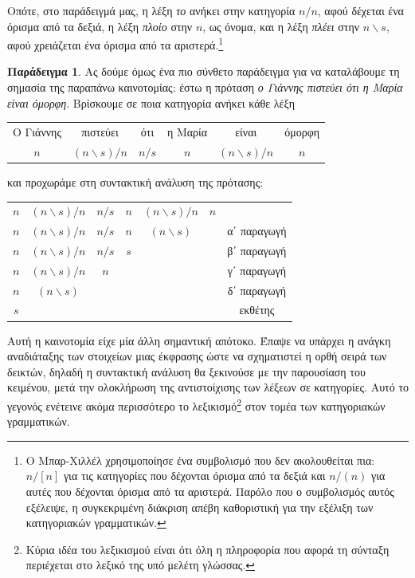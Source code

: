 \documentclass [a4paper,11pt] {book}
\theoremstyle{definition}
\newtheorem{example}[theorem]{Παράδειγμα}
\theoremstyle{definition}
\begin{document}
Οπότε, στο παράδειγμά μας, η λέξη \textit{το} ανήκει στην κατηγορία $n/n$, αφού δέχεται ένα όρισμα από τα δεξιά, η λέξη \textit{πλοίο} στην $n$, ως όνομα, και η λέξη \textit{πλέει} στην $n \backslash s$, αφού χρειάζεται ένα όρισμα από τα αριστερά.\footnote{Ο Μπαρ-Χιλλέλ χρησιμοποίησε ένα συμβολισμό που δεν ακολουθείται πια: $n/[n]$ για τις κατηγορίες που δέχονται όρισμα από τα δεξιά και $n/(n)$ για αυτές που δέχονται όρισμα από τα αριστερά. Παρόλο που ο συμβολισμός αυτός εξέλειψε, η συγκεκριμένη διάκριση απέβη καθοριστική για την εξέλιξη των κατηγοριακών γραμματικών.}
\begin{example}
\label{complexExampleABGr}
Ας δούμε όμως ένα πιο σύνθετο παράδειγμα για να καταλάβουμε τη σημασία της παραπάνω καινοτομίας: έστω η πρόταση \textit{ο Γιάννης πιστεύει ότι η Μαρία είναι όμορφη}. Βρίσκουμε σε ποια κατηγορία ανήκει κάθε λέξη
\begin{center}
\begin{tabular}{cccccc}
Ο Γιάννης & πιστεύει & ότι & η Μαρία & είναι & όμορφη\\ 
$n$ & $(n\backslash s)/n$ & $n/s$ & $n$ & $(n\backslash s)/n$ & $n$ \\ 
\end{tabular} 
\end{center}
και προχωράμε στη συντακτική ανάλυση της πρότασης:
\begin{center}
\begin{tabular}{ccccccc}
$n$ & $(n\backslash s)/n$ & $n/s$ & $n$ & $(n\backslash s)/n$ & $n$ \\
$n$ & $(n\backslash s)/n$ & $n/s$ & $n$ & $(n\backslash s)$ && α΄ παραγωγή\\
$n$ & $(n\backslash s)/n$ & $n/s$ & $s$ &&& β΄ παραγωγή\\
$n$ & $(n\backslash s)/n$ & $n$ &&&& γ΄ παραγωγή\\
$n$ & $(n\backslash s)$ &&&&& δ΄ παραγωγή\\
$s$ &&&&&& εκθέτης
\end{tabular}
\end{center}
\end{example}
Αυτή η καινοτομία είχε μία άλλη σημαντική απότοκο. Έπαψε να υπάρχει η ανάγκη αναδιάταξης των στοιχείων μιας έκφρασης ώστε να σχηματιστεί η ορθή σειρά των δεικτών, δηλαδή η συντακτική ανάλυση θα ξεκινούσε με την παρουσίαση του κειμένου, μετά την ολοκλήρωση της αντιστοίχισης των λέξεων σε κατηγορίες. Αυτό το γεγονός ενέτεινε ακόμα περισσότερο το λεξικισμό\footnote{Κύρια ιδέα του λεξικισμού είναι ότι όλη η πληροφορία που αφορά τη σύνταξη περιέχεται στο λεξικό της υπό μελέτη γλώσσας.} στον τομέα των κατηγοριακών γραμματικών.
\end{document}
